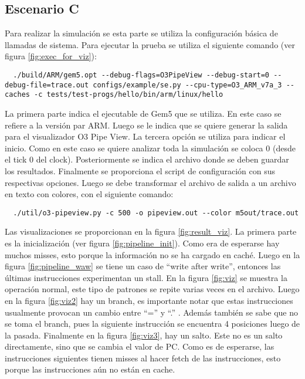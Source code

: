 \documentclass {article}
\begin{document}
\subsection{Escenario C}

Para realizar la simulación se esta parte se utiliza la configuración básica de llamadas de
sistema. Para ejecutar la prueba se utiliza el siguiente comando (ver figura \ref{fig:exec_for_viz}):

\begin{lstlisting}
  ./build/ARM/gem5.opt --debug-flags=O3PipeView --debug-start=0 --debug-file=trace.out configs/example/se.py --cpu-type=O3_ARM_v7a_3 --caches -c tests/test-progs/hello/bin/arm/linux/hello
\end{lstlisting}

La primera parte indica el ejecutable de Gem5 que se utiliza. En este caso se refiere a la versión
par ARM. Luego se le indica que se quiere generar la salida para el visualizador O3 Pipe View. La
tercera opción se utiliza para indicar el inicio. Como en este caso se quiere analizar toda la
simulación se coloca 0 (desde el tick 0 del clock). Posteriormente se indica el archivo donde se
deben guardar los resultados. Finalmente se proporciona el script de configuración con sus
respectivas opciones. Luego se debe transformar el archivo de salida a un archivo en texto con
colores, con el siguiente comando:

\begin{lstlisting}
  ./util/o3-pipeview.py -c 500 -o pipeview.out --color m5out/trace.out
\end{lstlisting}

Las visualizaciones se proporcionan en la figura \ref{fig:result_viz}. La primera parte es la
inicialización (ver figura \ref{fig:pipeline_init}). Como era de esperarse hay muchos misses, esto
porque la información no se ha cargado en caché. Luego en la figura \ref{fig:pipeline_waw} se tiene
un caso de ``write after write'', entonces las últimas instrucciones experimentan un stall. En la
figura \ref{fig:viz} se muestra la operación normal, este tipo de patrones se repite varias veces
en el archivo. Luego en la figura \ref{fig:viz2} hay un branch, es importante notar que estas
instrucciones usualmente provocan un cambio entre ``='' y ``.'' . Además también se sabe que no se
toma el branch, pues la siguiente instrucción se encuentra 4 posiciones luego de la
pasada. Finalmente en la figura \ref{fig:viz3}, hay un salto. Este no es un salto directamente, sino
que se cambia el valor de PC. Como es de esperarse, las instrucciones siguientes tienen misses al
hacer fetch de las instrucciones, esto porque las instrucciones aún no están en cache.
\end{document}
